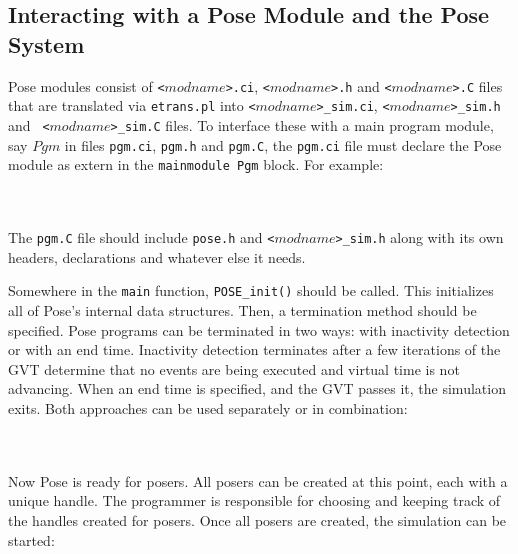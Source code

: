 \documentclass[10pt]{article}
\newcommand{\pose}{{\sc Pose}}
\begin{document}
\subsection{Interacting with a \pose{} Module and the \pose{} System}

\pose{} modules consist of {\tt <$modname$>.ci}, {\tt <$modname$>.h}
and {\tt <$modname$>.C} files that are translated via {\tt etrans.pl}
into {\tt <$modname$>\_sim.ci}, {\tt <$modname$>\_sim.h} and {\tt
<$modname$>\_sim.C} files.  To interface these with a main program
module, say $Pgm$ in files {\tt pgm.ci}, {\tt pgm.h} and {\tt pgm.C},
the {\tt pgm.ci} file must declare the \pose{} module as extern in the
{\tt mainmodule Pgm} block. For example:

~\\
\\

The {\tt pgm.C} file should include {\tt pose.h} and {\tt<$modname$>\_sim.h}
along with its own headers, declarations and whatever else it needs.

Somewhere in the {\tt main} function, {\tt POSE\_init()} should be
called.  This initializes all of \pose{}'s internal data structures.
Then, a termination method should be specified.  \pose{} programs can
be terminated in two ways: with inactivity detection or with an end
time.  Inactivity detection terminates after a few iterations of the
GVT determine that no events are being executed and virtual time is
not advancing.  When an end time is specified, and the GVT passes it,
the simulation exits.  Both approaches can be used separately or in
combination:

~\\
\\

Now \pose{} is ready for posers.  All posers can be created at this
point, each with a unique handle.  The programmer is responsible for
choosing and keeping track of the handles created for posers.  Once
all posers are created, the simulation can be started:
\end{document}
